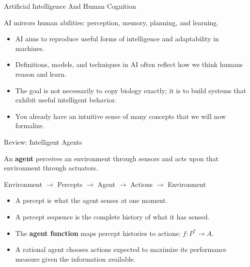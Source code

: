\documentclass[aspectratio=169,10pt]{beamer}
\begin{document}
\makedecktitle


\begin{frame}[shrink=10]{Artificial Intelligence And Human Cognition}
  \begin{keyidea}
    AI mirrors human abilities: perception, memory, planning, and learning.
  \end{keyidea}
  \vspace{0.12in}
  \begin{itemize}
    \item AI aims to reproduce useful forms of intelligence and adaptability in machines.
    \item Definitions, models, and techniques in AI often reflect how we think humans reason and learn.
    \item The goal is not necessarily to copy biology exactly; it is to build systems that exhibit useful intelligent behavior.
    \item You already have an intuitive sense of many concepts that we will now formalize.
  \end{itemize}
\end{frame}

\begin{frame}{Review: Intelligent Agents}
  \begin{cpdefinition}
    An \textbf{agent} perceives an environment through sensors and acts upon that environment through actuators.
  \end{cpdefinition}
  \vspace{0.12in}
  \begin{center}
    {\Large Environment $\rightarrow$ Percepts $\rightarrow$ Agent $\rightarrow$ Actions $\rightarrow$ Environment}
  \end{center}
  \vspace{0.12in}
  \begin{itemize}
    \item A percept is what the agent senses at one moment.
    \item A percept sequence is the complete history of what it has sensed.
    \item The \textbf{agent function} maps percept histories to actions: $f:P^*\rightarrow A$.
    \item A rational agent chooses actions expected to maximize its performance measure given the information available.
  \end{itemize}
\end{frame}
\end{document}
